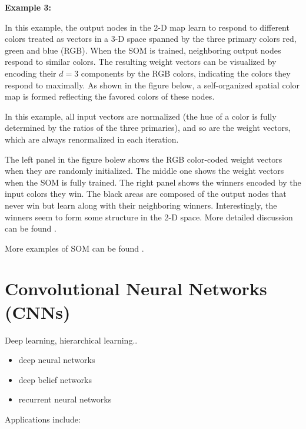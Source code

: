 \documentclass{article}
\begin{document}
{\bf Example 3:} 

In this example, the output nodes in the 2-D map learn to respond 
to different colors treated as vectors in a 3-D space spanned by the 
three primary colors red, green and blue (RGB). When the SOM is trained, 
neighboring output nodes respond to similar colors. The resulting weight
vectors can be visualized by encoding their $d=3$ components by the RGB 
colors, indicating the colors they respond to maximally. As shown in the
figure below, a self-organized spatial color map is formed reflecting the 
favored colors of these nodes.

In this example, all input vectors are normalized (the hue of a color
is fully determined by the ratios of the three primaries), and so are
the weight vectors, which are always renormalized in each iteration.

The left panel in the figure bolew shows the RGB color-coded weight vectors
when they are randomly initialized. The middle one shows the weight vectors
when the SOM is fully trained. The right panel shows the winners encoded by
the input colors they win. The black areas are composed of the output nodes
that never win but learn along with their neighboring winners. Interestingly,
the winners seem to form some structure in the 2-D space. More detailed
discussion can be found 
.



More examples of SOM can be found .



\section{Convolutional Neural Networks (CNNs)}





Deep learning, hierarchical learning..
\begin{itemize}
\item deep neural networks
\item deep belief networks
\item recurrent neural networks
\end{itemize}
Applications include:
\end{document}
